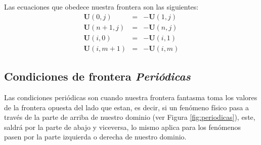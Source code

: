 \documentclass[12pt,a4paper]{book}
\begin{document}
Las ecuaciones que obedece nuestra frontera son las siguientes:
\begin{eqnarray}
\textbf{U}(0,j)&=&-\textbf{U}(1,j) \\
\textbf{U}(n+1,j)&=&-\textbf{U}(n,j) \\
\textbf{U}(i,0)&=&-\textbf{U}(i,1) \\
\textbf{U}(i,m+1)&=&-\textbf{U}(i,m) 
\end{eqnarray}


\subsection{Condiciones de frontera \emph{Periódicas}}
Las condiciones periódicas son cuando nuestra frontera fantasma toma los valores de la frontera opuesta del lado que estan, es decir, si un fenómeno físico pasa a través de la parte de arriba de nuestro dominio (ver Figura \ref{fig:periodicas}), este, saldrá por la parte de abajo y viceversa, lo mismo aplica para los fenómenos pasen por la parte izquierda o derecha de nuestro dominio.
 
\end{document}

